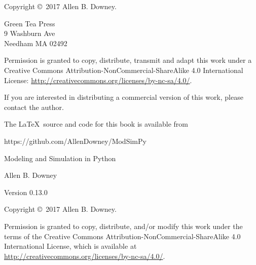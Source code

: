 \documentclass[12pt]{book}
\newcommand{\thetitle}{Modeling and Simulation in Python}
\newcommand{\theauthors}{Allen B. Downey}
\newcommand{\theversion}{0.13.0}
\theoremstyle{exercise}
\begin{document}
\begin{latexonly}
\begin{flushright}
\vfill

\end{flushright}



\pagebreak
\thispagestyle{empty}

Copyright \copyright ~2017 \theauthors.



\vspace{0.2in}

\begin{flushleft}
Green Tea Press       \\
9 Washburn Ave \\
Needham MA 02492
\end{flushleft}

Permission is granted to copy, distribute, transmit and adapt this work under a Creative Commons Attribution-NonCommercial-ShareAlike 4.0 International License: \url{http://creativecommons.org/licenses/by-nc-sa/4.0/}.

If you are interested in distributing a commercial version of this
work, please contact the author.

The \LaTeX\ source and code for this book is available from

\begin{code}
https://github.com/AllenDowney/ModSimPy
\end{code}


\cleardoublepage
\setcounter{tocdepth}{1}
\tableofcontents

\end{latexonly}



\begin{htmlonly}

\vspace{1em}

{\Large \thetitle}

{\large \theauthors}

Version \theversion

\vspace{1em}

Copyright \copyright ~2017 \theauthors.

Permission is granted to copy, distribute, and/or modify this work
under the terms of the Creative Commons
Attribution-NonCommercial-ShareAlike 4.0 International License, which is
available at \url{http://creativecommons.org/licenses/by-nc-sa/4.0/}.

\vspace{1em}

\setcounter{chapter}{-1}

\end{htmlonly}
\end{document}
